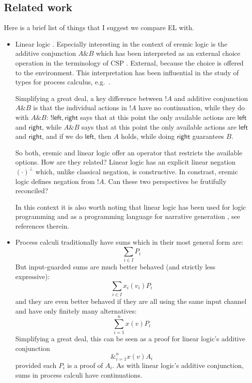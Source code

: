 \subsection{Related work}

Here is a brief list of things that I suggest we compare EL with.

\begin{itemize}

\item Linear logic \cite{GirardJY:linlog,GirardJY:protyp}. Especially
  interesting in the context of eremic logic is the additive
  conjunction $A \& B$ which has been interpreted
  \cite{AbramskyS:comintoll} as an external choice operation in the
  terminology of CSP \cite{HoareC:comseq}. External, because the
  choice is offered to the environment. This interpretation has been
  influential in the study of types for process calculus,
  e.g.~\cite{HondaK:unitypsfsifLONG,TakeuchiK:intbaslaits,HondaK:lanpriatdfscbp}. 

  Simplifying a great deal, a key difference between $!A$ and additive
  conjunction $A \& B$ is that the individual actions in $!A$ have no
  continuation, while they do with $A \& B$: $!{\mathsf{left},
    \mathsf{right}}$ says that at this point the only available
  actions are $\mathsf{left}$ and $\mathsf{right}$, while $A \& B$
  says that at this point the only available actions are
  $\mathsf{left}$ and $\mathsf{right}$, and if we do $\mathsf{left}$,
  then $A$ holds, while doing $\mathsf{right}$ guarantees $B$.

  So both, eremic and linear logic offer an operator that restricts
  the available options. How are they related? Linear logic has an
  explicit linear negation $(\cdot)^{\bot}$ which, unlike classical
  negation, is constructive. In constrast, eremic logic defines
  negation from $!A$. Can these two perspectives be frutifully
  reconciled?

  In this context it is also worth noting that linear logic has been
  used for logic programming
  \cite{HodasJS:logproiafoill,WinikoffMD:logprowll,PymDJ:uniprotiollp,HarlandJ:prolygao,MillerD:surlinlp}
  and as a programming language for narrative generation
  \cite{BosserAG:linlogpfng}, see references therein.


\item Process calculi traditionally 
  have sums which in their most general form are:
  \[
     \sum_{i \in I} P_i
  \]
  But input-guarded sums are much better behaved (and strictly less
  expressive):
  \[
     \sum_{i \in I} x_{i}(v_i)P_i
  \]
  and they are even better behaved if they are all using the same
  input channel and have only finitely many alternatives:
  \[
     \sum_{i = 1}^n x(v)P_i
  \]
  Simplifying a great deal, this can be seen as a proof for linear
  logic's additive conjunction
  \[
     \&_{i = 1}^n x(v)A_i
  \]
  provided each $P_i$ is a proof of $A_i$.  As with linear logic's
  additive conjunction, sums in process calculi have continuations.
  

\end{itemize}
